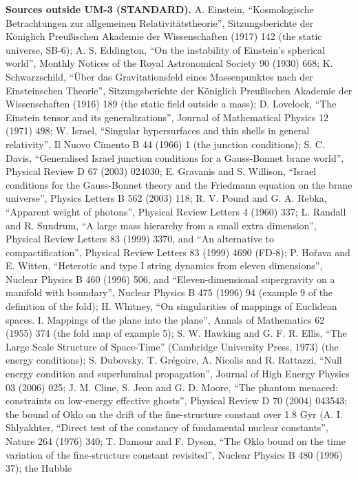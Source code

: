 \documentclass[
  10pt,
]{article}
\begin{document}
\textbf{Sources outside UM-3 (STANDARD).} A. Einstein, ``Kosmologische
Betrachtungen zur allgemeinen Relativitätstheorie'', Sitzungsberichte
der Königlich Preußischen Akademie der Wissenschaften (1917) 142 (the
static universe, SB-6); A. S. Eddington, ``On the instability of
Einstein's spherical world'', Monthly Notices of the Royal Astronomical
Society 90 (1930) 668; K. Schwarzschild, ``Über das Gravitationsfeld
eines Massenpunktes nach der Einsteinschen Theorie'', Sitzungsberichte
der Königlich Preußischen Akademie der Wissenschaften (1916) 189 (the
static field outside a mass); D. Lovelock, ``The Einstein tensor and its
generalizations'', Journal of Mathematical Physics 12 (1971) 498; W.
Israel, ``Singular hypersurfaces and thin shells in general
relativity'', Il Nuovo Cimento B 44 (1966) 1 (the junction conditions);
S. C. Davis, ``Generalised Israel junction conditions for a Gauss-Bonnet
brane world'', Physical Review D 67 (2003) 024030; E. Gravanis and S.
Willison, ``Israel conditions for the Gauss-Bonnet theory and the
Friedmann equation on the brane universe'', Physics Letters B 562 (2003)
118; R. V. Pound and G. A. Rebka, ``Apparent weight of photons'',
Physical Review Letters 4 (1960) 337; L. Randall and R. Sundrum, ``A
large mass hierarchy from a small extra dimension'', Physical Review
Letters 83 (1999) 3370, and ``An alternative to compactification'',
Physical Review Letters 83 (1999) 4690 (FD-8); P. Hořava and E. Witten,
``Heterotic and type I string dynamics from eleven dimensions'', Nuclear
Physics B 460 (1996) 506, and ``Eleven-dimensional supergravity on a
manifold with boundary'', Nuclear Physics B 475 (1996) 94 (example 9 of
the definition of the fold); H. Whitney, ``On singularities of mappings
of Euclidean spaces. I. Mappings of the plane into the plane'', Annals
of Mathematics 62 (1955) 374 (the fold map of example 5); S. W. Hawking
and G. F. R. Ellis, ``The Large Scale Structure of Space-Time''
(Cambridge University Press, 1973) (the energy conditions); S. Dubovsky,
T. Grégoire, A. Nicolis and R. Rattazzi, ``Null energy condition and
superluminal propagation'', Journal of High Energy Physics 03 (2006)
025; J. M. Cline, S. Jeon and G. D. Moore, ``The phantom menaced:
constraints on low-energy effective ghosts'', Physical Review D 70
(2004) 043543; the bound of Oklo on the drift of the fine-structure
constant over 1.8 Gyr (A. I. Shlyakhter, ``Direct test of the constancy
of fundamental nuclear constants'', Nature 264 (1976) 340; T. Damour and
F. Dyson, ``The Oklo bound on the time variation of the fine-structure
constant revisited'', Nuclear Physics B 480 (1996) 37); the Hubble
\end{document}
